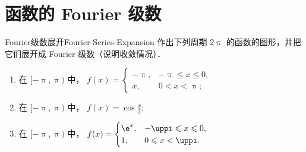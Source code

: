 \section{函数的 Fourier 级数}

\begin{problem}{Fourier级数展开}{Fourier-Series-Expansion}
    作出下列周期 $2\uppi$ 的函数的图形，并把它们展开成 Fourier 级数（说明收敛情况）．
    \begin{enumerate}
        \item 在 $[-\uppi, \uppi)$ 中， $f(x) = \begin{cases} -\uppi, & -\uppi \leqslant x \leqslant 0, \\ x, & 0 < x < \uppi; \end{cases}$
        \item 在 $[-\uppi, \uppi)$ 中， $f(x) = \cos \frac{x}{2}$;
        \item 在 $[-\uppi, \uppi)$ 中， $f(x) = \begin{cases} \e^x, & -\uppi \leqslant x \leqslant 0, \\ 1, & 0 \leqslant x < \uppi. \end{cases}$
    \end{enumerate}
\end{problem}

